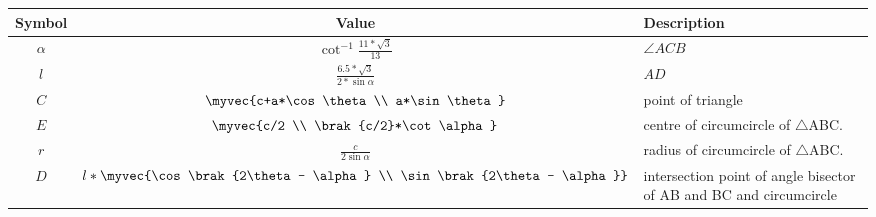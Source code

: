 \begin{tabular}{|c|c|p{3.5cm}|}
\hline
\textbf{Symbol} & \textbf{Value} & \textbf{Description}\\
\hline
$\alpha$ & $\cot^{-1} \frac{11*\sqrt{3}}{13}$ & $\angle ACB$\\
\hline
$l$ & $\frac{6.5*\sqrt{3}}{2*\sin \alpha}$ & $AD$\\
\hline
$C$ & $\myvec{c+a*\cos \theta \\ a*\sin \theta}$ & point of triangle\\
\hline
$E$ & $\myvec{c/2 \\ \brak{c/2}*\cot \alpha}$ & centre of circumcircle of $\bigtriangleup$ABC.\\
\hline
$r$ & $\frac{c}{2\sin \alpha}$ & radius of circumcircle of $\bigtriangleup$ABC.\\
\hline
$D$ & $l*\myvec{\cos \brak{2\theta - \alpha} \\ \sin \brak{2\theta - \alpha}}$ & intersection point of angle bisector of AB and BC and circumcircle\\
\hline
 \end{tabular}